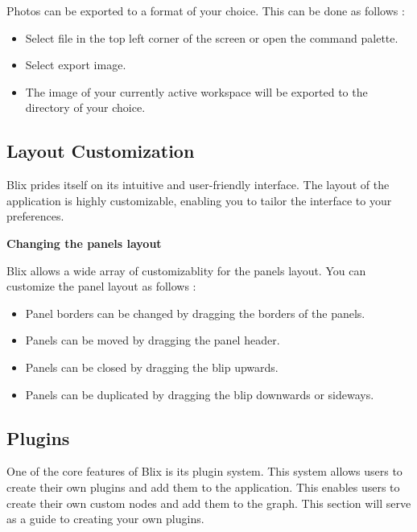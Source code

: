 \documentclass[11pt,a4paper]{article}
\begin{document}
Photos can be exported to a format of your choice. This can be done as follows :

\begin{itemize}
  \item[\textbullet] Select file in the top left corner of the screen or open the command palette.
  \item[\textbullet] Select export image.
  \item[\textbullet] The image of your currently active workspace will be exported to the directory of your choice.
\end{itemize}

\subsection*{Layout Customization}

Blix prides itself on its intuitive and user-friendly interface. The layout of the application is highly customizable, enabling you to tailor the interface to your preferences.

\textbf{Changing the panels layout}

Blix allows a wide array of customizablity for the panels layout. You can customize the panel layout as follows :

\begin{itemize}
  \item[\textbullet] Panel borders can be changed by dragging the borders of the panels.
  \item[\textbullet] Panels can be moved by dragging the panel header.
  \item[\textbullet] Panels can be closed by dragging the blip upwards.
  \item[\textbullet] Panels can be duplicated by dragging the blip downwards or sideways.
\end{itemize}


\subsection*{Plugins}

One of the core features of Blix is its plugin system. This system allows users to create their own plugins and add them to the application. This enables users to create their own custom nodes and 
add them to the graph. This section will serve as a guide to creating your own plugins.
\end{document}
